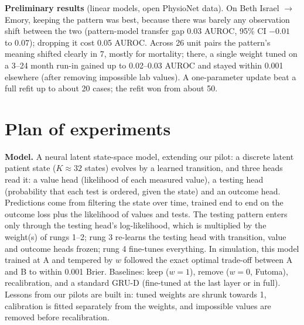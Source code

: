 \documentclass[11pt,a4paper]{article}
\begin{document}
\textbf{Preliminary results} (linear models, open PhysioNet data). On Beth Israel $\to$ Emory, keeping the pattern was best, because there was barely any observation shift between the two (pattern-model transfer gap 0.03 AUROC, 95\% CI $-0.01$ to $0.07$); dropping it cost 0.05 AUROC. Across 26 unit pairs the pattern's meaning shifted clearly in 7, mostly for mortality; there, a single weight tuned on a 3--24 month run-in gained up to 0.02--0.03 AUROC and stayed within 0.001 elsewhere (after removing impossible lab values). A one-parameter update beat a full refit up to about 20 cases; the refit won from about 50.

\section{Plan of experiments}

\textbf{Model.} A neural latent state-space model, extending our pilot: a discrete latent patient state ($K{\approx}32$ states) evolves by a learned transition, and three heads read it: a value head (likelihood of each measured value), a testing head (probability that each test is ordered, given the state) and an outcome head. Predictions come from filtering the state over time, trained end to end on the outcome loss plus the likelihood of values and tests. The testing pattern enters only through the testing head's log-likelihood, which is multiplied by the weight(s) of rungs 1--2; rung 3 re-learns the testing head with transition, value and outcome heads frozen; rung 4 fine-tunes everything. In simulation, this model trained at A and tempered by $w$ followed the exact optimal trade-off between A and B to within 0.001 Brier. Baselines: keep ($w{=}1$), remove ($w{=}0$, Futoma), recalibration, and a standard GRU-D (fine-tuned at the last layer or in full). Lessons from our pilots are built in: tuned weights are shrunk towards 1, calibration is fitted separately from the weights, and impossible values are removed before recalibration.
\end{document}
